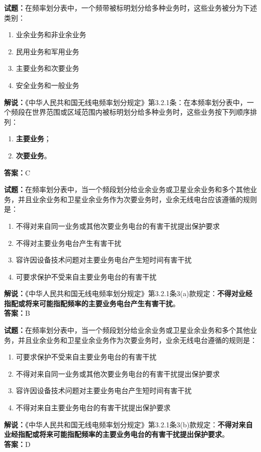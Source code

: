 \documentclass{ctexbook}
\begin{document}
\bigskip

\noindent\textbf{试题：}在频率划分表中，一个频带被标明划分给多种业务时，这些业务被分为下述类别：
\begin{enumerate}[leftmargin=3em]
  \item 业余业务和非业余业务
  \item 民用业务和军用业务
  \item 主要业务和次要业务
  \item 安全业务和一般业务
\end{enumerate}
\noindent\textbf{解说：}《中华人民共和国无线电频率划分规定》第3.2.1条：在本频率划分表中，一个频段在世界范围或区域范围内被标明划分给多种业务时，这些业务按下列顺序排列：
\begin{enumerate}[leftmargin=3em, label=\alph*)]
  \item \textbf{主要业务}；
  \item \textbf{次要业务}。
\end{enumerate}
\textbf{答案：}C

\bigskip

\noindent\textbf{试题：}在频率划分表中，当一个频段划分给业余业务或卫星业余业务和多个其他业务，并且业余业务和卫星业余业务作为次要业务时，业余无线电台应该遵循的规则是：
\begin{enumerate}[leftmargin=3em]
  \item 不得对来自同一业务或其他次要业务电台的有害干扰提出保护要求
  \item 不得对主要业务电台产生有害干扰
  \item 容许因设备技术问题对主要业务电台产生短时间有害干扰
  \item 可要求保护不受来自主要业务电台的有害干扰
\end{enumerate}
\noindent\textbf{解说：}《中华人民共和国无线电频率划分规定》第3.2.1条3(a)款规定：\textbf{不得对业经指配或将来可能指配频率的主要业务电台产生有害干扰}。\\
\textbf{答案：}B

\bigskip

\noindent\textbf{试题：}在频率划分表中，当一个频段划分给业余业务或卫星业余业务和多个其他业务，并且业余业务和卫星业余业务作为次要业务时，业余无线电台遵循的规则是：
\begin{enumerate}[leftmargin=3em]
  \item 可要求保护不受来自主要业务电台的有害干扰
  \item 不得对来自同一业务或其他次要业务电台的有害干扰提出保护要求
  \item 容许因设备技术问题对主要业务电台产生短时间有害干扰
  \item 不得对来自主要业务电台的有害干扰提出保护要求
\end{enumerate}
\noindent\textbf{解说：}《中华人民共和国无线电频率划分规定》第3.2.1条3(b)款规定：\textbf{不得对来自业经指配或将来可能指配频率的主要业务电台的有害干扰提出保护要求}。\\\textbf{答案：}D
\end{document}
